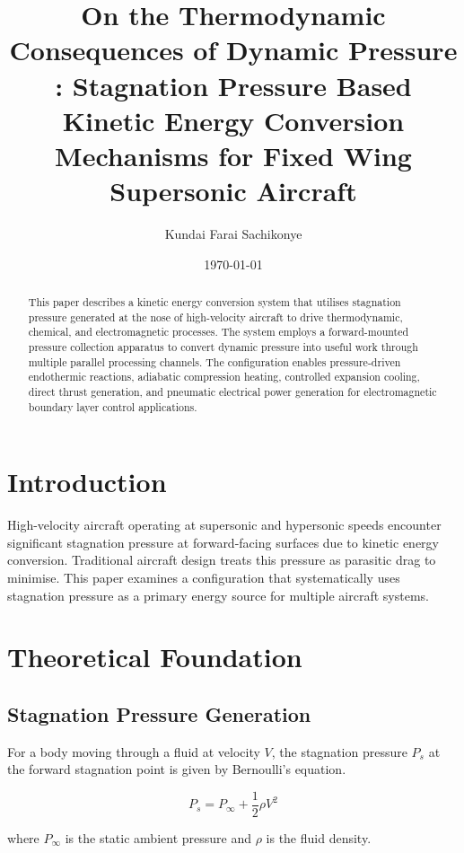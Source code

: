 \documentclass[12pt,a4paper]{article}
\title{On the Thermodynamic Consequences of Dynamic Pressure : Stagnation Pressure Based Kinetic Energy Conversion Mechanisms for Fixed Wing Supersonic Aircraft}
\author{Kundai Farai Sachikonye}
\date{\today}
\begin{document}
\maketitle

\begin{abstract}
This paper describes a kinetic energy conversion system that utilises stagnation pressure generated at the nose of high-velocity aircraft to drive thermodynamic, chemical, and electromagnetic processes. The system employs a forward-mounted pressure collection apparatus to convert dynamic pressure into useful work through multiple parallel processing channels. The configuration enables pressure-driven endothermic reactions, adiabatic compression heating, controlled expansion cooling, direct thrust generation, and pneumatic electrical power generation for electromagnetic boundary layer control applications.
\end{abstract}

\section{Introduction}

High-velocity aircraft operating at supersonic and hypersonic speeds encounter significant stagnation pressure at forward-facing surfaces due to kinetic energy conversion. Traditional aircraft design treats this pressure as parasitic drag to minimise. This paper examines a configuration that systematically uses stagnation pressure as a primary energy source for multiple aircraft systems.

\section{Theoretical Foundation}

\subsection{Stagnation Pressure Generation}

For a body moving through a fluid at velocity $V$, the stagnation pressure $P_s$ at the forward stagnation point is given by Bernoulli's equation.

\begin{equation}
P_s = P_\infty + \frac{1}{2}\rho V^2
\end{equation}

where $P_\infty$ is the static ambient pressure and $\rho$ is the fluid density.
\end{document}
